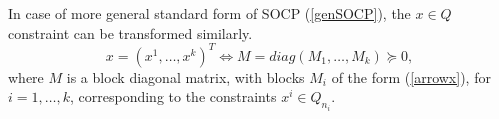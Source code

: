 \documentclass[10pt,oneside]{book}
\theoremstyle{definition}
\begin{document}
In case of more general standard form of SOCP (\ref{genSOCP}), the $x\in Q$ constraint 
can be transformed similarly. 
\begin{equation}
x = (x^1,\dots, x^k)^T \Leftrightarrow  M = diag(M_1,\dots, M_k) \succeq 0,
\end{equation}
where $M$ is a block diagonal matrix, with blocks $M_i$ of the form (\ref{arrowx}), for $i=1,\dots, k$,
corresponding to the constraints $x^i\in Q_{n_i}$.

\end{document}
